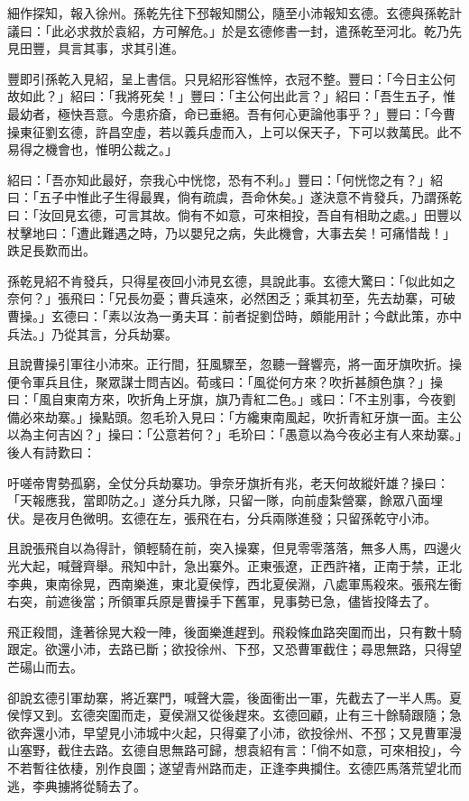 細作探知，報入徐州。孫乾先往下邳報知關公，隨至小沛報知玄德。玄德與孫乾計議曰：「此必求救於袁紹，方可解危。」於是玄德修書一封，遣孫乾至河北。乾乃先見田豐，具言其事，求其引進。

豐即引孫乾入見紹，呈上書信。只見紹形容憔悴，衣冠不整。豐曰：「今日主公何故如此？」紹曰：「我將死矣！」豐曰：「主公何出此言？」紹曰：「吾生五子，惟最幼者，極快吾意。今患疥瘡，命已垂絕。吾有何心更論他事乎？」豐曰：「今曹操東征劉玄德，許昌空虛，若以義兵虛而入，上可以保天子，下可以救萬民。此不易得之機會也，惟明公裁之。」

紹曰：「吾亦知此最好，奈我心中恍惚，恐有不利。」豐曰：「何恍惚之有？」紹曰：「五子中惟此子生得最異，倘有疏虞，吾命休矣。」遂決意不肯發兵，乃謂孫乾曰：「汝回見玄德，可言其故。倘有不如意，可來相投，吾自有相助之處。」田豐以杖擊地曰：「遭此難遇之時，乃以嬰兒之病，失此機會，大事去矣！可痛惜哉！」跌足長歎而出。

孫乾見紹不肯發兵，只得星夜回小沛見玄德，具說此事。玄德大驚曰：「似此如之奈何？」張飛曰：「兄長勿憂；曹兵遠來，必然困乏；乘其初至，先去劫寨，可破曹操。」玄德曰：「素以汝為一勇夫耳：前者捉劉岱時，頗能用計；今獻此策，亦中兵法。」乃從其言，分兵劫寨。

且說曹操引軍往小沛來。正行間，狂風驟至，忽聽一聲響亮，將一面牙旗吹折。操便令軍兵且住，聚眾謀士問吉凶。荀彧曰：「風從何方來？吹折甚顏色旗？」操曰：「風自東南方來，吹折角上牙旗，旗乃青紅二色。」彧曰：「不主別事，今夜劉備必來劫寨。」操點頭。忽毛玠入見曰：「方纔東南風起，吹折青紅牙旗一面。主公以為主何吉凶？」操曰：「公意若何？」毛玠曰：「愚意以為今夜必主有人來劫寨。」後人有詩歎曰：

吁嗟帝冑勢孤窮，全仗分兵劫寨功。爭奈牙旗折有兆，老天何故縱奸雄？操曰：「天報應我，當即防之。」遂分兵九隊，只留一隊，向前虛紮營寨，餘眾八面埋伏。是夜月色微明。玄德在左，張飛在右，分兵兩隊進發；只留孫乾守小沛。

且說張飛自以為得計，領輕騎在前，突入操寨，但見零零落落，無多人馬，四邊火光大起，喊聲齊舉。飛知中計，急出寨外。正東張遼，正西許褚，正南于禁，正北李典，東南徐晃，西南樂進，東北夏侯惇，西北夏侯淵，八處軍馬殺來。張飛左衝右突，前遮後當；所領軍兵原是曹操手下舊軍，見事勢已急，儘皆投降去了。

飛正殺間，逢著徐晃大殺一陣，後面樂進趕到。飛殺條血路突圍而出，只有數十騎跟定。欲還小沛，去路已斷；欲投徐州、下邳，又恐曹軍截住；尋思無路，只得望芒碭山而去。

卻說玄德引軍劫寨，將近寨門，喊聲大震，後面衝出一軍，先截去了一半人馬。夏侯惇又到。玄德突圍而走，夏侯淵又從後趕來。玄德回顧，止有三十餘騎跟隨；急欲奔還小沛，早望見小沛城中火起，只得棄了小沛，欲投徐州、不邳；又見曹軍漫山塞野，截住去路。玄德自思無路可歸，想袁紹有言：「倘不如意，可來相投」，今不若暫往依棲，別作良圖；遂望青州路而走，正逢李典攔住。玄德匹馬落荒望北而逃，李典擄將從騎去了。

